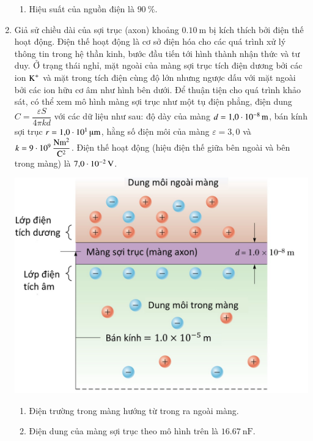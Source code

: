 \begin{enumerate}[label=\bfseries Câu \arabic*:]
\begin{enumerate}[label=\alph*)]
	\item Hiệu suất của nguồn điện là $\SI{90}{\percent}$.
\end{enumerate}
	\item Giả sử chiều dài của sợi trục (axon) khoảng $\SI{0.10}{\meter}$ bị kích thích bởi điện thế hoạt động. Điện thế hoạt động là cơ sở điện hóa cho các quá trình xử lý thông tin trong hệ thần kinh, bước đầu tiến tới hình thành nhận thức và tư duy. Ở trạng thái nghỉ, mặt ngoài của màng sợi trục tích điện dương bởi các ion $\ce{K^+}$ và mặt trong tích điện cùng độ lớn nhưng ngược dấu với mặt ngoài bởi các ion hữu cơ âm như hình bên dưới. Để thuận tiện cho quá trình khảo sát, có thể xem mô hình màng sợi trục như một tụ điện phẳng, điện dung $C=\dfrac{\varepsilon S}{4\pi k d}$ với các dữ liệu như sau: độ dày của màng $d=\SI{1.0E-8}{\meter}$, bán kính sợi trục $r=\SI{1.0E1}{\micro\meter}$, hằng số điện môi của màng $\varepsilon=3,0$ và $k=\SI{9E9}{\dfrac{\newton\meter^2}{\coulomb^2}}$. Điện thế hoạt động (hiệu điện thế giữa bên ngoài và bên trong màng) là $\SI{7.0E-2}{\volt}$.
	\begin{center}
		\includegraphics[width=0.55\linewidth]{../figs/PH11-FinalSem2-02-1}
	\end{center}
\begin{enumerate}[label=\alph*)]
	\item Điện trường trong màng hướng từ trong ra ngoài màng.
	\item Điện dung của màng sợi trục theo mô hình trên là $\SI{16.67}{\nano\farad}$.

\end{enumerate}
\end{enumerate}
